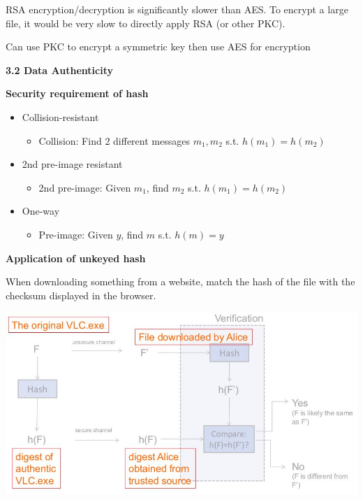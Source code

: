 \documentclass[landscape,a4paper]{extarticle}
\newenvironment{Figure}
  {\par\noindent\minipage{\linewidth}}
  {\endminipage\par\medskip}
\begin{document}
\begin{multicols*}{5}
    RSA encryption/decryption is significantly slower than AES. To encrypt a large file, it would 
    be very slow to directly apply RSA (or other PKC).

    Can use PKC to encrypt a symmetric key then use AES for encryption

    \textbf{3.2 Data Authenticity}

    \textbf{Security requirement of hash}

    \begin{itemize}
        \item Collision-resistant
        \begin{itemize}
            \item Collision: Find 2 different messages $m_1, m_2$ s.t. $h(m_1) = h(m_2)$
        \end{itemize}
        \item 2nd pre-image resistant
        \begin{itemize}
            \item 2nd pre-image: Given $m_1$, find $m_2$ s.t. $h(m_1) = h(m_2)$
        \end{itemize}
        \item One-way
        \begin{itemize}
            \item Pre-image: Given $y$, find $m$ s.t. $h(m) = y$
        \end{itemize}
    \end{itemize}

    \textbf{Application of unkeyed hash}

    When downloading something from a website, match the hash of the file with the checksum
    displayed in the browser.

    \begin{Figure}
        \centering
        \includegraphics[width=\linewidth]{hash_application_vlc.jpg}
    \end{Figure}


\end{multicols*}
\end{document}

